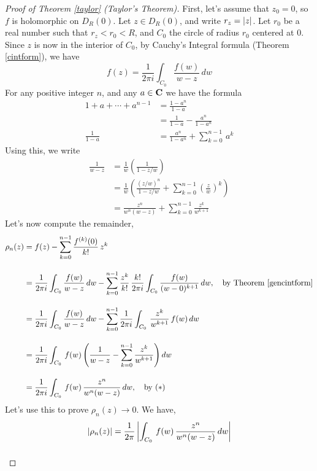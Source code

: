 \vspace*{1em}

\begin{proof}[Proof of Theorem \ref{taylor} (Taylor's Theorem)]
First, let's assume that $z_0 = 0$, so $f$ is holomorphic on $D_R(0)$. Let $z \in D_R(0)$, and write $r_z = \left\lvert z\right\rvert$. Let $r_0$ be a real number such that $r_z < r_0 < R$, and $C_0$ the circle of radius $r_0$ centered at $0$.\\[0.5em]
Since $z$ is now in the interior of $C_0$, by Cauchy's Integral formula (Theorem \ref{cintform}), we have
\[f(z) = \frac{1}{2\pi i} \int_{C_0}\frac{f(w)}{w - z}\,dw\]
For any positive integer $n$, and any $a \in \mathbf C$ we have the formula
\begin{align*}
1 + a + \cdots + a^{n-1} &= \frac{1 - a^n}{1 - a}\\[0.5em]
 &= \frac{1}{1 - a} - \frac{a^n}{1 - a^n}\\[1em]
\frac{1}{1 - a} &= \frac{a^n}{1 - a^n} + \sum_{k=0}^{n-1}\,a^k
\end{align*}
Using this, we write
\begin{align*}
\frac{1}{w - z} &= \frac{1}{w}\left(\frac{1}{1 - z/w}\right)\\[0.5em]
 &= \frac{1}{w}\left(\frac{(z/w)^n}{1 - z/w} + \sum_{k=0}^{n-1}\left(\frac{z}{w}\right)^k\right)\\[0.5em]
 &= \frac{z^n}{w^n(w - z)} + \sum_{k=0}^{n-1}\frac{z^k}{w^{k+1}}\tag{$*$}
\end{align*}
Let's now compute the remainder, 
\begin{align*}
\rho_n(z) &= f(z) - \sum_{k=0}^{n-1}\frac{f^{(k)}(0)}{k!}\,z^k\\[1em]
 &= \frac{1}{2\pi i} \int_{C_0}\frac{f(w)}{w - z}\,dw - \sum_{k=0}^{n-1}\frac{z^k}{k!}\,\frac{k!}{2\pi i} \int_{C_0}\frac{f(w)}{(w - 0)^{k+1}}\,dw,\quad \text{by Theorem \ref{gencintform}}\\[1em]
 &= \frac{1}{2\pi i} \int_{C_0}\frac{f(w)}{w - z}\,dw - \sum_{k=0}^{n-1}\frac{1}{2\pi i} \int_{C_0}\,\frac{z^k}{w^{k+1}}\,f(w)\,dw\\[1em]
 &= \frac{1}{2\pi i} \int_{C_0}\,f(w)\left(\frac{1}{w - z} - \sum_{k=0}^{n-1}\frac{z^k}{w^{k+1}}\right) dw\\[1em]
 &= \frac{1}{2\pi i} \int_{C_0}\,f(w)\,\frac{z^n}{w^n(w - z)}\, dw,\quad \text{by ($*$)}
\end{align*}
Let's use this to prove $\rho_n(z) \to 0$. We have,
\begin{align*}
\abs{\rho_n(z)} &= \frac{1}{2\pi}\abs{\int_{C_0}\,f(w)\,\frac{z^n}{w^n(w - z)}\, dw}\\[1em]

\end{align*}
\end{proof}
